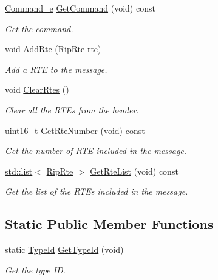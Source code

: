 \begin{DoxyCompactItemize}
\hyperlink{classns3_1_1RipHeader_a8c6ce779ee35c8b65446aaa202a6e789}{Command\+\_\+e} \hyperlink{classns3_1_1RipHeader_ac6bec597fae32cabff1ea23ac55edbbd}{Get\+Command} (void) const 
\begin{DoxyCompactList}\small\item\em Get the command. \end{DoxyCompactList}\item 
void \hyperlink{classns3_1_1RipHeader_a6c32234456f7341b66b3f7be38ccb249}{Add\+Rte} (\hyperlink{classns3_1_1RipRte}{Rip\+Rte} rte)
\begin{DoxyCompactList}\small\item\em Add a R\+TE to the message. \end{DoxyCompactList}\item 
void \hyperlink{classns3_1_1RipHeader_ab1c9854e4490e4edf68532e4d44bfdf2}{Clear\+Rtes} ()
\begin{DoxyCompactList}\small\item\em Clear all the R\+T\+Es from the header. \end{DoxyCompactList}\item 
uint16\+\_\+t \hyperlink{classns3_1_1RipHeader_ae2dc200bb100ca5f34e4a6918a93b50b}{Get\+Rte\+Number} (void) const 
\begin{DoxyCompactList}\small\item\em Get the number of R\+TE included in the message. \end{DoxyCompactList}\item 
\hyperlink{openflow-interface_8h_afd9bcfa176617760671b67580f536fa7}{std\+::list}$<$ \hyperlink{classns3_1_1RipRte}{Rip\+Rte} $>$ \hyperlink{classns3_1_1RipHeader_a4046f3c5a7a1308e1529bc738a7e58ce}{Get\+Rte\+List} (void) const 
\begin{DoxyCompactList}\small\item\em Get the list of the R\+T\+Es included in the message. \end{DoxyCompactList}\end{DoxyCompactItemize}
\subsection*{Static Public Member Functions}
\begin{DoxyCompactItemize}
\item 
static \hyperlink{classns3_1_1TypeId}{Type\+Id} \hyperlink{classns3_1_1RipHeader_a9a8c66c93c4ea743cb27dce258bc456c}{Get\+Type\+Id} (void)
\begin{DoxyCompactList}\small\item\em Get the type ID. \end{DoxyCompactList}\end{DoxyCompactItemize}
